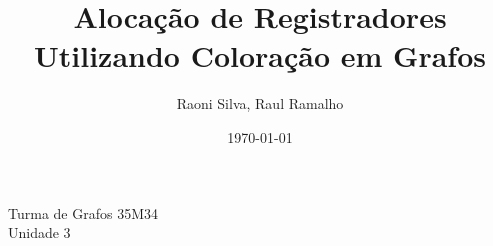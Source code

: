 \documentclass[a4paper,12pt]{article}
\title{Alocação de Registradores Utilizando Coloração em Grafos}
\author{Raoni Silva, Raul Ramalho}
\date{\today}
\begin{document}
\maketitle

\noindent Turma de Grafos 35M34 \\ Unidade 3

\newpage

\tableofcontents












\end{document}
